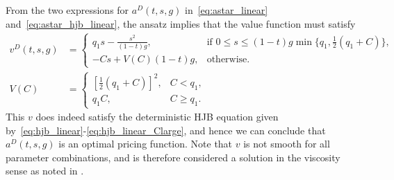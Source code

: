 \documentclass[main.tex]{subfiles}
\begin{document}
From the two expressions for $a^D(t,s,g)$ in~\eqref{eq:astar_linear}
and~\eqref{eq:astar_hjb_linear}, the ansatz implies that the value
function must satisfy
\begin{align}\label{eq:v_func_linear_det}
  v^D(t,s,g)
  &=\begin{cases}
    q_1s-\frac{s^2}{(1-t)g},
    &\text{if } 0\leq s\leq
    (1-t)g\min\{q_1,\frac{1}{2}(q_1 +C)\},\\
    -Cs + V(C)(1-t)g,
    &\text{otherwise.}
  \end{cases}\\
  V(C)
  &= \begin{cases}
    {\left[\frac{1}{2}(q_1+C)  \right]}^2,&C<
    q_1,\\
    q_1C,&C\geq q_1.
  \end{cases}
\end{align}
This $v$ does indeed satisfy the deterministic HJB equation given
by~\eqref{eq:hjb_linear}-\eqref{eq:hjb_linear_Clarge}, and hence we
can conclude that $a^D(t,s,g)$ is an optimal pricing function. Note that $v$ is
not smooth for all parameter combinations, and is therefore considered
a solution in the viscosity sense as noted in .
\end{document}
